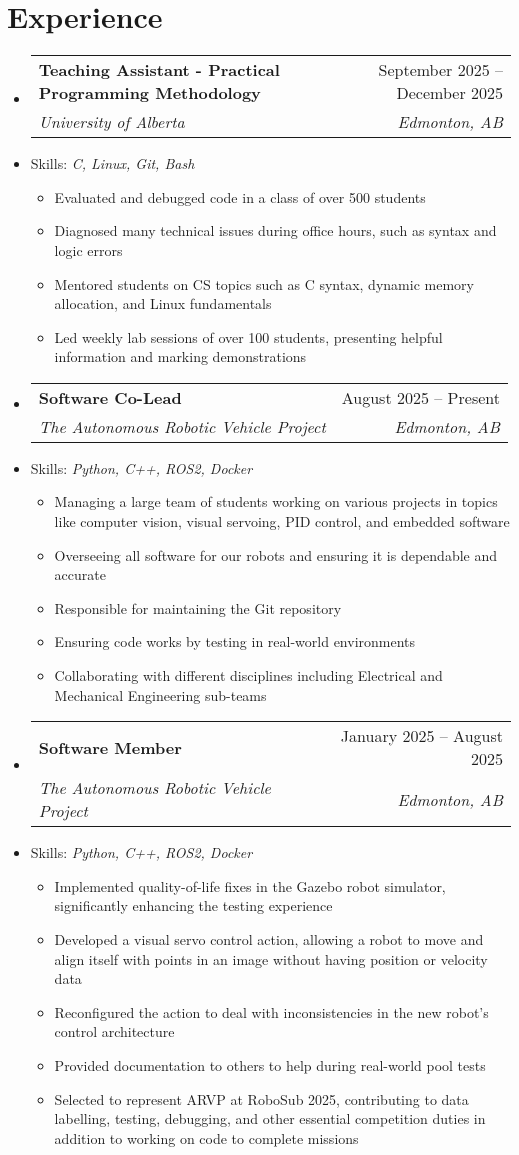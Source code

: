 \documentclass[letterpaper,11pt]{article}
\makeatletter
\newcommand{\resumeItem}[1]{
  \item\small{
    {#1 \vspace{-2pt}}
  }
}
\newcommand{\resumeSubheading}[4]{
  \vspace{-2pt}\item
    \begin{tabular*}{0.97\textwidth}[t]{l@{\extracolsep{\fill}}r}
      \textbf{#1} & #2 \\
      \textit{\small#3} & \textit{\small #4} \\
    \end{tabular*}\vspace{-7pt}
}
\newcommand{\resumeSubSubheading}[2]{
    \item
    \begin{tabular*}{0.97\textwidth}{l@{\extracolsep{\fill}}r}
      \textit{\small#1} & \textit{\small #2} \\
    \end{tabular*}\vspace{-7pt}
}
\newcommand{\resumeSubItem}[1]{\resumeItem{#1}\vspace{-4pt}}
\newcommand{\resumeSubHeadingListStart}{\begin{itemize}[leftmargin=0.15in, label={}]}
\newcommand{\resumeSubHeadingListEnd}{\end{itemize}}
\newcommand{\resumeItemListStart}{\begin{itemize}}
\newcommand{\resumeItemListEnd}{\end{itemize}\vspace{-5pt}}
\makeatother
\begin{document}
\section{Experience}	
  \resumeSubHeadingListStart
  	 \resumeSubheading
      {Teaching Assistant - Practical Programming Methodology}{September 2025 -- December 2025}
      {University of Alberta}{Edmonton, AB}
      \resumeSubItem{Skills: \emph{C, Linux, Git, Bash}}
      \resumeItemListStart
        \resumeItem{Evaluated and debugged code in a class of over 500 students}
        \resumeItem{Diagnosed many technical issues during office hours, such as syntax and logic errors}
        \resumeItem{Mentored students on CS topics such as C syntax, dynamic memory allocation, and Linux fundamentals}
        \resumeItem{Led weekly lab sessions of over 100 students, presenting helpful information and marking demonstrations}
      \resumeItemListEnd
  	\resumeSubheading
      {Software Co-Lead}{August 2025 -- Present}
      {The Autonomous Robotic Vehicle Project}{Edmonton, AB}
      \resumeSubItem{Skills: \emph{Python, C++, ROS2, Docker}}
      \resumeItemListStart
        \resumeItem{Managing a large team of students working on various projects in topics like computer vision, visual servoing, PID control, and embedded software}
        \resumeItem{Overseeing all software for our robots and ensuring it is dependable and accurate}
        \resumeItem{Responsible for maintaining the Git repository}
        \resumeItem{Ensuring code works by testing in real-world environments}
        \resumeItem{Collaborating with different disciplines including Electrical and Mechanical Engineering sub-teams}
      \resumeItemListEnd
    \resumeSubheading
      {Software Member}{January 2025 -- August 2025}
      {The Autonomous Robotic Vehicle Project}{Edmonton, AB}
     \resumeSubItem{Skills: \emph{Python, C++, ROS2, Docker}}
      \resumeItemListStart
        \resumeItem{Implemented quality-of-life fixes in the Gazebo robot simulator, significantly enhancing the testing experience}
        \resumeItem{Developed a visual servo control action, allowing a robot to move and align itself with points in an image without having position or velocity data}
        \resumeItem{Reconfigured the action to deal with inconsistencies in the new robot's control architecture}
        \resumeItem{Provided documentation to others to help during real-world pool tests}
        \resumeItem{Selected to represent ARVP at RoboSub 2025, contributing to data labelling, testing, debugging, and other essential competition duties in addition to working on code to complete missions}
      \resumeItemListEnd
      

  \resumeSubHeadingListEnd

\end{document}
